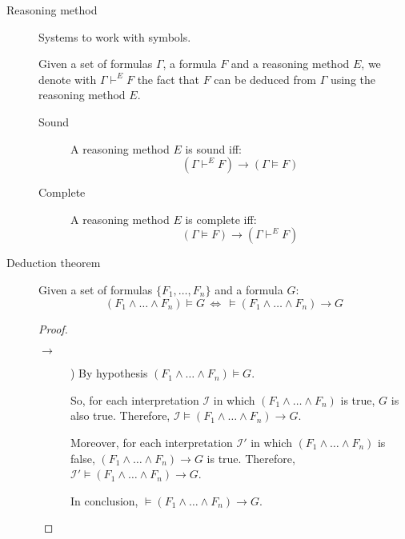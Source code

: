 \begin{description}
    \item[Reasoning method] 
        Systems to work with symbols.
        
        Given a set of formulas $\Gamma$, a formula $F$ and a reasoning method $E$,
        we denote with $\Gamma \vdash^E F$ the fact that $F$ can be deduced from $\Gamma$
        using the reasoning method $E$.

        \begin{description}
            \item[Sound] 
                A reasoning method $E$ is sound iff:
                \[ (\Gamma \vdash^E F) \rightarrow (\Gamma \models F) \]

            \item[Complete] 
                A reasoning method $E$ is complete iff:
                \[ (\Gamma \models F) \rightarrow (\Gamma \vdash^E F) \]
        \end{description}

    \item[Deduction theorem] 
        Given a set of formulas $\{ F_1, \dots, F_n \}$ and a formula $G$:
        \[ (F_1 \land \dots \land F_n) \models G \,\iff\, \models (F_1 \land \dots \land F_n) \rightarrow G \]
        
        \begin{proof} \phantom{}
            \begin{description}
                \item[$\rightarrow$])
                    By hypothesis $(F_1 \land \dots \land F_n) \models G$.
        
                    So, for each interpretation $\mathcal{I}$ in which $(F_1 \land \dots \land F_n)$ is true, 
                    $G$ is also true.
                    Therefore, $\mathcal{I} \models (F_1 \land \dots \land F_n) \rightarrow G$.
        
                    Moreover, for each interpretation $\mathcal{I}'$ in which $(F_1 \land \dots \land F_n)$ is false,
                    $(F_1 \land \dots \land F_n) \rightarrow G$ is true.
                    Therefore, $\mathcal{I}' \models (F_1 \land \dots \land F_n) \rightarrow G$.
        
                    In conclusion, $\models (F_1 \land \dots \land F_n) \rightarrow G$.
        

\end{description}
\end{proof}
\end{description}
